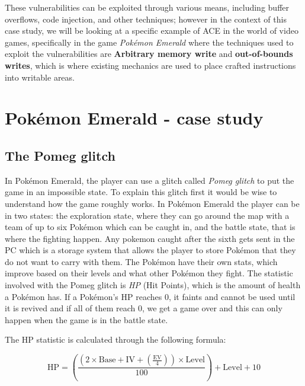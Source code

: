 \documentclass[a4paper]{usiinfbachelorproject}
\begin{document}
These vulnerabilities can be exploited through various means, including buffer overflows, code injection, and other techniques; however in the context of this case study, we will be looking at a specific example of ACE in the world of video games, specifically in the game \textit{Pokémon Emerald} where the techniques used to exploit the vulnerabilities are \textbf{Arbitrary memory write} and \textbf{out-of-bounds writes}, which is where existing mechanics are used to place crafted instructions into writable areas.




\section{\textbf{Pokémon Emerald - case study}}
\subsection{\textbf{The Pomeg glitch}}
In Pokémon Emerald, the player can use a glitch called \textit{Pomeg glitch} to put the game in an impossible state. To explain this glitch first it would be wise to understand how the game roughly works. In Pokémon Emerald the player can be in two states: the exploration state, where they can go around the map with a team of up to six Pokémon which can be caught in, and the battle state, that is where the fighting happen. Any pokemon caught after the sixth gets sent in the PC which is a storage system that allows the player to store Pokémon that they do not want to carry with them. The Pokémon have their own stats, which improve based on their levels and what other Pokémon they fight. The statistic involved with the Pomeg glitch is \textit{HP} (Hit Points), which is the amount of health a Pokémon has. If a Pokémon's HP reaches 0, it faints and cannot be used until it is revived and if all of them reach 0, we get a game over and this can only happen when the game is in the battle state.

The HP statistic is calculated through the following formula:

\begin{equation}
	\text{HP} = \left( \frac{(2 \times \text{Base} + \text{IV} + \left( \frac{\text{EV}}{4} \right)) \times \text{Level}}{100} \right) + \text{Level} + 10
	\label{eq:ergodic_hypothesis}
\end{equation}
\end{document}

